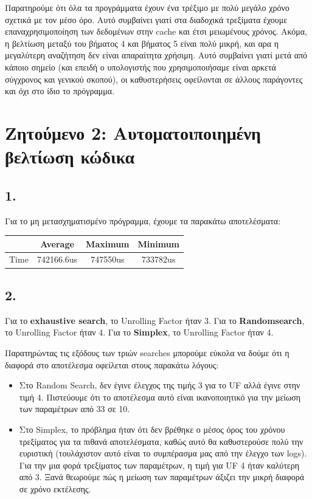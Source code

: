 \documentclass{article}
\newcommand{\english}[1]{\foreignlanguage{english}{{#1}}}
\begin{document}
Παρατηρούμε ότι όλα τα προγράμματα έχουν ένα τρέξιμο με πολύ μεγάλο χρόνο σχετικά με τον μέσο όρο. Αυτό συμβαίνει γιατί στα διαδοχικά τρεξίματα έχουμε επαναχρησιμοποίηση των δεδομένων στην cache και έτσι μειωμένους χρόνος. Ακόμα, η βελτίωση μεταξύ του βήματος 4 και βήματος 5 είναι πολύ μικρή, και αρα η μεγαλύτερη αναζήτηση δεν είναι απαραίτητα χρήσιμη. Αυτό συμβαίνει γιατί μετά από κάποιο σημείο (και επειδή ο υπολογιστής που χρησιμοποιήσαμε είναι αρκετά σύγχρονος και γενικού σκοπού), οι καθυστερήσεις οφείλονται σε άλλους παράγοντες και όχι στο ίδιο το πρόγραμμα.

\section*{Ζητούμενο 2: Αυτοματοιποιημένη \\ βελτίωση κώδικα}

\subsection*{1.}
Για το μη μετασχηματισμένο πρόγραμμα, έχουμε τα παρακάτω αποτελέσματα:
\begin{otherlanguage}{english}
    \begin{center}
        \begin{tabular}{|c|c|c|c|}\hline
            & Average & Maximum & Minimum \\ \hline
            Time &  742166.6us & 747550us & 733782us\\ \hline
       \end{tabular}
    \end{center}
\end{otherlanguage}

\subsection*{2.}
Για το \english{\textbf{exhaustive search}}, το \english{Unrolling Factor} ήταν 3.
Για το \english{\textbf{Randomsearch}}, το \english{Unrolling Factor} ήταν 4.
Για το \english{\textbf{Simplex}}, το \english{Unrolling Factor} ήταν 4.

Παρατηρώντας τις εξόδους των τριών searches μπορούμε εύκολα να δούμε ότι η διαφορά στο αποτέλεσμα οφείλεται στους παρακάτω λόγους:
\begin{itemize}
    \item Στο \english{Random Search}, δεν έγινε έλεγχος της τιμής 3 για το \english{UF} αλλά έγινε στην τιμή 4. Πιστεύουμε ότι το αποτέλεσμα αυτό είναι ικανοποιητικό για την μείωση των παραμέτρων από 33 σε 10.
    \item Στο \english{Simplex}, το πρόβλημα ήταν ότι δεν βρέθηκε ο μέσος όρος του χρόνου τρεξίματος για τα πιθανά αποτελέσματα, καθώς αυτό θα καθυστερούσε πολύ την ευριστική (τουλάχιστον αυτό είναι το συμπέρασμα μας από την έλεγχο των \english{logs}). Για την μια φορά τρεξίματος των παραμέτρων, η τιμή για \english{UF} 4 ήταν καλύτερη από 3. Ξανά θεωρούμε πώς η μείωση των παραμέτρων άξιζει την μικρή διαφορά σε χρόνο εκτέλεσης.
\end{itemize}
\end{document}
